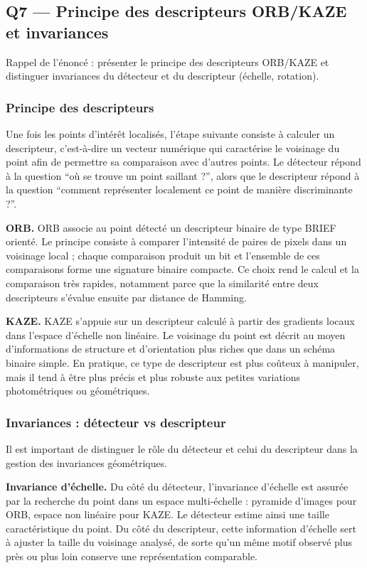 \documentclass[11pt,a4paper]{article}
\begin{document}
\subsection{Q7 --- Principe des descripteurs ORB/KAZE et invariances}
Rappel de l'énoncé : présenter le principe des descripteurs ORB/KAZE et distinguer invariances du détecteur et du descripteur (échelle, rotation).

\subsubsection{Principe des descripteurs}
Une fois les points d'intérêt localisés, l'étape suivante consiste à calculer un descripteur, c'est-à-dire un vecteur numérique qui caractérise le voisinage du point afin de permettre sa comparaison avec d'autres points. Le détecteur répond à la question ``où se trouve un point saillant ?'', alors que le descripteur répond à la question ``comment représenter localement ce point de manière discriminante ?''.

\textbf{ORB.} ORB associe au point détecté un descripteur binaire de type BRIEF orienté. Le principe consiste à comparer l'intensité de paires de pixels dans un voisinage local ; chaque comparaison produit un bit et l'ensemble de ces comparaisons forme une signature binaire compacte. Ce choix rend le calcul et la comparaison très rapides, notamment parce que la similarité entre deux descripteurs s'évalue ensuite par distance de Hamming.

\textbf{KAZE.} KAZE s'appuie sur un descripteur calculé à partir des gradients locaux dans l'espace d'échelle non linéaire. Le voisinage du point est décrit au moyen d'informations de structure et d'orientation plus riches que dans un schéma binaire simple. En pratique, ce type de descripteur est plus coûteux à manipuler, mais il tend à être plus précis et plus robuste aux petites variations photométriques ou géométriques.

\subsubsection{Invariances : détecteur vs descripteur}
Il est important de distinguer le rôle du détecteur et celui du descripteur dans la gestion des invariances géométriques.

\textbf{Invariance d'échelle.} Du côté du détecteur, l'invariance d'échelle est assurée par la recherche du point dans un espace multi-échelle : pyramide d'images pour ORB, espace non linéaire pour KAZE. Le détecteur estime ainsi une taille caractéristique du point. Du côté du descripteur, cette information d'échelle sert à ajuster la taille du voisinage analysé, de sorte qu'un même motif observé plus près ou plus loin conserve une représentation comparable.
\end{document}
